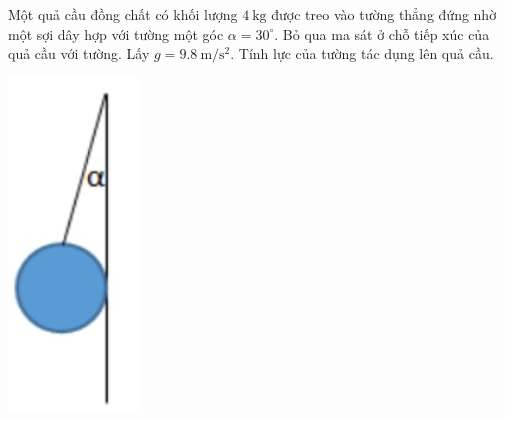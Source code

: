 \begin{enumerate}[label=\bfseries Câu \arabic*:]
	{ Một quả cầu đồng chất có khối lượng $\SI{4}{\kilogram}$ được treo vào tường thẳng đứng nhờ một sợi dây hợp với tường một góc $\alpha=30^\circ$. Bỏ qua ma sát ở chỗ tiếp xúc của quả cầu với tường. Lấy $g=\SI{9,8}{\meter/\second^2}$. Tính lực của tường tác dụng lên quả cầu.
		\begin{center}
			\includegraphics[scale=0.8]{../figs/VN10-2021-PH-TP011-3.jpg}
		\end{center}
	}

\end{enumerate}